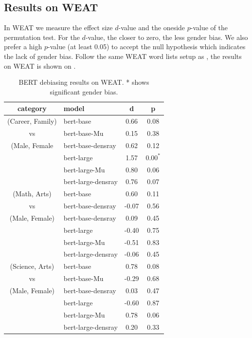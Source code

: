 \subsection{Results on WEAT}
In WEAT we measure the effect size $d$-value and the oneside $p$-value of the permutation test. For the $d$-value, the closer to zero, the less gender bias.  We also prefer a high $p$-value (at least 0.05) to accept the null hypothesis which indicates the lack of gender bias. Follow the same WEAT word lists setup as \citet{karve2019conceptor}, the results on WEAT is shown on .
\begin{table}[ht]
\centering
\footnotesize
\begin{tabular}{clcc}
\hline
category & model & d & p\\
\hline
(Career, Family) & bert-base & 0.66 & 0.08 \\
vs& bert-base-Mu & 0.15 & 0.38\\
(Male, Female&bert-base-densray & 0.62 & 0.12\\
& bert-large & 1.57 & $0.00^{*}$ \\
&bert-large-Mu & 0.80 & 0.06 \\
& bert-large-densray & 0.76 & 0.07\\
\hline
(Math, Arts) & bert-base & 0.60 & 0.11 \\
vs& bert-base-densray & -0.07 & 0.56\\
(Male, Female)& bert-base-densray & 0.09 & 0.45\\
& bert-large & -0.40 & 0.75 \\
& bert-large-Mu & -0.51 & 0.83\\
& bert-large-densray & -0.06 & 0.45\\
\hline
(Science, Arts)& bert-base & 0.78 & 0.08 \\
vs& bert-base-Mu & -0.29 & 0.68\\
(Male, Female)& bert-base-densray & 0.03 & 0.47\\
& bert-large & -0.60 & 0.87  \\
& bert-large-Mu & 0.78 & 0.06\\
& bert-large-densray & 0.20 & 0.33\\
\hline
\end{tabular}
\caption{
BERT debiasing results on WEAT. * shows significant gender bias.}
\end{table}
